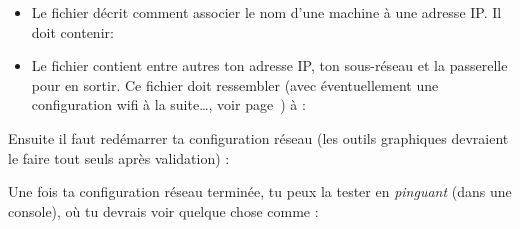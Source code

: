 \begin{description}
\begin{itemize}
 \item Le fichier  décrit comment associer le nom d'une machine à une adresse IP.
 Il doit contenir: 
 
 \item Le fichier  contient entre autres ton adresse IP,
 ton sous-réseau et la passerelle pour en sortir. Ce fichier doit
 ressembler (avec éventuellement une configuration wifi à la suite\ldots,
 voir page~\pageref{wifi}) à :
 
 \end{itemize}
 
 Ensuite il faut redémarrer ta configuration réseau (les outils graphiques devraient le faire tout seuls après validation) :
 
 
 \end{description}

Une fois ta configuration réseau terminée, tu peux la tester en \emph{pinguant} \fkz (dans une console), où tu devrais voir quelque chose comme :


